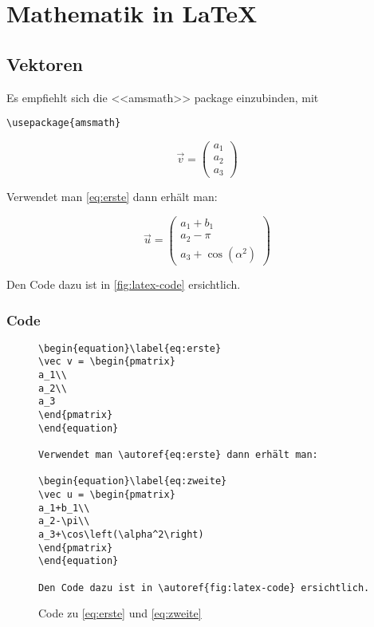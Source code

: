 \chapter{Mathematik in \LaTeX}\label{sec:mathezeugs}

\section{Vektoren}

Es empfiehlt sich die <<amsmath>> package einzubinden, mit
\begin{verbatim}
\usepackage{amsmath}
\end{verbatim}

\begin{equation}\label{eq:erste}
\vec v = \begin{pmatrix}
a_1\\
a_2\\
a_3
\end{pmatrix}
\end{equation}

Verwendet man \autoref{eq:erste} dann erhält man:

\begin{equation}\label{eq:zweite}
\vec u = \begin{pmatrix}
a_1+b_1\\
a_2-\pi\\
a_3+\cos\left(\alpha^2\right)
\end{pmatrix}
\end{equation}

Den Code dazu ist in \autoref{fig:latex-code} ersichtlich.

\subsection{Code}
\begin{figure}[ht]
\centering
\begin{minipage}{0.8\textwidth}
\begin{verbatim}
\begin{equation}\label{eq:erste}
\vec v = \begin{pmatrix}
a_1\\
a_2\\
a_3
\end{pmatrix}
\end{equation}

Verwendet man \autoref{eq:erste} dann erhält man:

\begin{equation}\label{eq:zweite}
\vec u = \begin{pmatrix}
a_1+b_1\\
a_2-\pi\\
a_3+\cos\left(\alpha^2\right)
\end{pmatrix}
\end{equation}

Den Code dazu ist in \autoref{fig:latex-code} ersichtlich.

\end{verbatim}
\end{minipage}
\caption{Code zu \autoref{eq:erste} und \autoref{eq:zweite}}
\label{fig:latex-code}
\end{figure}
